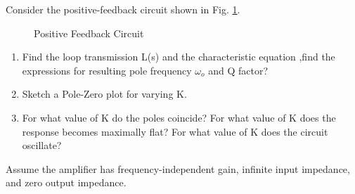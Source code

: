 Consider the positive-feedback circuit shown in Fig. \ref{fig:ee18btech11030}. 
\begin{figure}[!ht]
	\begin{center}
		\resizebox{\columnwidth/1}{!}{}
	\end{center}
	\caption{ Positive Feedback Circuit}
	\label{fig:ee18btech11030}
\end{figure}
\begin{enumerate}[label=(\alph*),ref=\theenumi]

\item Find the loop transmission L(s) and the characteristic equation ,find the expressions for resulting pole frequency $\omega_o$ and Q factor?
\item Sketch a Pole-Zero plot for varying K. 
\item For what value of K do the poles coincide? For what value of K does the response becomes maximally flat? For what value of K does the circuit oscillate?
\end{enumerate}
Assume the amplifier has frequency-independent gain, infinite input impedance, and zero output impedance.
